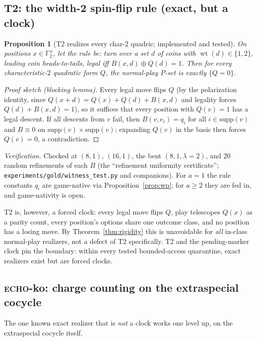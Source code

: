 \documentclass[11pt]{article}
\theoremstyle{plain}
\newtheorem{proposition}{Proposition}
\theoremstyle{definition}
\newcommand{\F}{\mathbb{F}}
\newcommand{\wt}{\operatorname{wt}}
\begin{document}
\subsection{T2: the width-2 spin-flip rule (exact, but a clock)}

\begin{proposition}[T2 realizes every char-2 quadric; implemented and
tested]\label{prop:t2}
On positions $x\in\F_2^n$, let the rule be: turn over a set $d$ of
coins with $\wt(d)\in\{1,2\}$, leading coin heads-to-tails, legal iff
$B(x,d)\oplus Q(d)=1$. Then for every characteristic-$2$ quadratic form
$Q$, the normal-play $P$-set is exactly $\{Q=0\}$.
\end{proposition}

\begin{proof}[Proof sketch (blocking lemma)]
Every legal move flips $Q$ (by the polarization identity, since
$Q(x+d)=Q(x)+Q(d)+B(x,d)$ and legality forces $Q(d)+B(x,d)=1$), so it
suffices that every position with $Q(v)=1$ has a legal descent. If all
descents from $v$ fail, then $B(v,e_i)=q_i$ for all $i\in\mathrm{supp}(v)$
and $B\equiv0$ on $\mathrm{supp}(v)\times\mathrm{supp}(v)$; expanding
$Q(v)$ in the basis then forces $Q(v)=0$, a contradiction.
\end{proof}

\noindent\emph{Verification.} Checked at $(8,1)$, $(16,1)$, the bent
$(8,1,\lambda=2)$, and $20$ random refinements of each $B$ (the
``refinement uniformity certificate'';
\texttt{experiments/gold/witness\_test.py} and companions). For $a=1$ the
rule constants $q_i$ are game-native via Proposition~\ref{prop:wp}; for
$a\geq2$ they are fed in, and game-nativity is open.

T2 is, however, a forced clock: every legal move flips $Q$, play telescopes
$Q(x)$ as a parity count, every position's options share one outcome class,
and no position has a losing move. By Theorem~\ref{thm:rigidity} this is
unavoidable for \emph{all} in-class normal-play realizers, not a defect of
T2 specifically. T2 and the pending-marker clock pin the boundary: within
every tested bounded-access quarantine, exact realizers exist but are
forced clocks.

\subsection{\textsc{echo}-ko: charge counting on the extraspecial cocycle}

The one known exact realizer that is \emph{not} a clock works one level up,
on the extraspecial cocycle itself.
\end{document}
